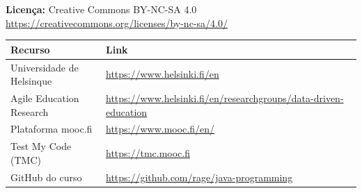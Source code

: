 \documentclass[11pt,a4paper]{article}
\begin{document}
\textbf{Licença:} Creative Commons BY-NC-SA 4.0\\
\url{https://creativecommons.org/licenses/by-nc-sa/4.0/}

\begin{center}
\begin{tabular}{l l}
\toprule
\textbf{Recurso} & \textbf{Link} \\
\midrule
Universidade de Helsinque   & \url{https://www.helsinki.fi/en} \\
Agile Education Research    & \url{https://www.helsinki.fi/en/researchgroups/data-driven-education} \\
Plataforma mooc.fi          & \url{https://www.mooc.fi/en/} \\
Test My Code (TMC)          & \url{https://tmc.mooc.fi} \\
GitHub do curso             & \url{https://github.com/rage/java-programming} \\
\bottomrule
\end{tabular}
\end{center}
\end{document}
